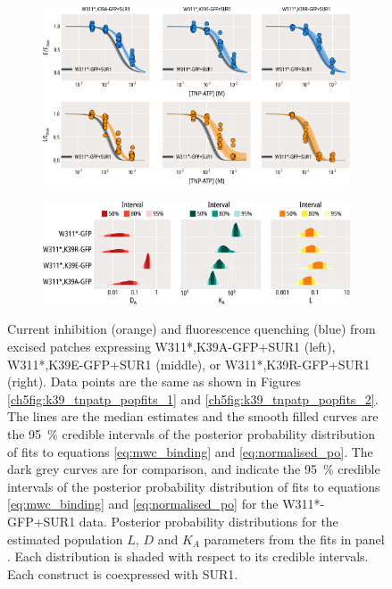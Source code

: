 \begin{figure}[hbtp]
	\centering
	\begin{subfigure}[t]{0.9\textwidth}
		\caption{}\label{ch5fig:mwc_k39_1}
		\centering
		\includegraphics[width=\textwidth]{mwc_k39_1.pdf}
	\end{subfigure}
	\vfill
	\begin{subfigure}[t]{0.9\textwidth}
		\caption{}\label{ch5fig:mwc_k39_2}
		\centering
		\includegraphics[width=\textwidth]{mwc_k39_2.pdf}
	\end{subfigure}
	\caption[K39 mutations affect gating and nucleotide binding]{
	{\bf{}}
	 Current inhibition (orange) and fluorescence quenching (blue) from excised patches expressing W311*,K39A-GFP+SUR1 (left), W311*,K39E-GFP+SUR1 (middle), or W311*,K39R-GFP+SUR1 (right).
	Data points are the same as shown in Figures \ref{ch5fig:k39_tnpatp_popfits_1} and \ref{ch5fig:k39_tnpatp_popfits_2}.
	The lines are the median estimates and the smooth filled curves are the \SI{95}{\percent} credible intervals of the posterior probability distribution of fits to equations \ref{eq:mwc_binding} and \ref{eq:normalised_po}.
	The dark grey curves are for comparison, and indicate the \SI{95}{\percent} credible intervals of the posterior probability distribution of fits to equations \ref{eq:mwc_binding} and \ref{eq:normalised_po} for the W311*-GFP+SUR1 data.
	 Posterior probability distributions for the estimated population $L$, $D$ and $K_A$ parameters from the fits in panel .
	Each distribution is shaded with respect to its credible intervals.
	Each construct is coexpressed with SUR1.
	}\label{ch5fig:k39_2}
\end{figure}

